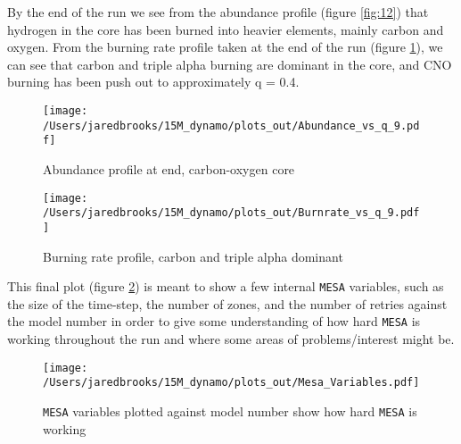 \documentclass{article}
\begin{document}
        \pagebreak

        By the end of the run we see from the abundance profile (figure \ref{fig:12}) that hydrogen in the core has been burned into heavier elements, mainly carbon and oxygen.  From the burning rate profile taken at the end of the run (figure \ref{fig:13}), we can see that carbon and triple alpha burning are dominant in the core, and CNO burning has been push out to approximately q = 0.4.

        \begin{figure}[H]
                \begin{minipage}[b]{0.5\linewidth}
                       \centering
                       \texttt{[image: /Users/jaredbrooks/15M\_dynamo/plots\_out/Abundance\_vs\_q\_9.pdf]}
                       \caption{Abundance profile at end, carbon-oxygen core}
                       \label{fig:12}
                \end{minipage}
                \hspace{0cm}
                \begin{minipage}[b]{0.5\linewidth}
                       \centering
                       \texttt{[image: /Users/jaredbrooks/15M\_dynamo/plots\_out/Burnrate\_vs\_q\_9.pdf]}
                       \caption{Burning rate profile, carbon and triple alpha dominant}
                       \label{fig:13}
                \end{minipage}
        \end{figure}

        \pagebreak

        This final plot (figure \ref{fig:7}) is meant to show a few internal \texttt{MESA} variables, such as the size of the time-step, the number of zones, and the number of retries against the model number in order to give some understanding of how hard \texttt{MESA} is working throughout the run and where some areas of problems/interest might be.

        \begin{figure}[H]
                \centering
                \texttt{[image: /Users/jaredbrooks/15M\_dynamo/plots\_out/Mesa\_Variables.pdf]}
                \caption{\texttt{MESA} variables plotted against model number show how hard \texttt{MESA} is working}
                \label{fig:7}
        \end{figure}
\end{document}
